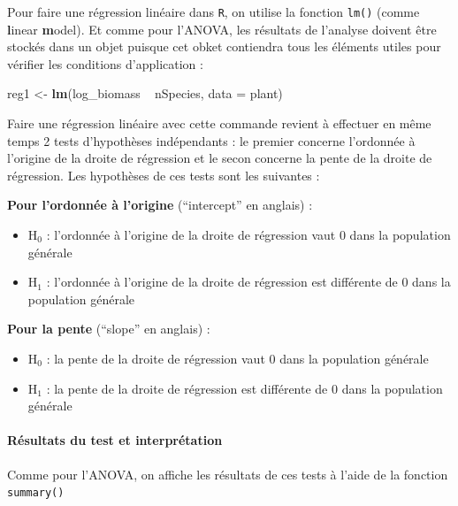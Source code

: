\documentclass[a4paperpaper,]{article}
\newenvironment{Shaded}{\begin{snugshade}}{\end{snugshade}}
\newcommand{\DataTypeTok}[1]{\textcolor[rgb]{0.00,0.34,0.68}{#1}}
\newcommand{\KeywordTok}[1]{\textcolor[rgb]{0.12,0.11,0.11}{\textbf{#1}}}
\newcommand{\NormalTok}[1]{\textcolor[rgb]{0.12,0.11,0.11}{#1}}
\newcommand{\OperatorTok}[1]{\textcolor[rgb]{0.12,0.11,0.11}{#1}}
\newcommand{\StringTok}[1]{\textcolor[rgb]{0.75,0.01,0.01}{#1}}
\providecommand{\tightlist}{%
  \setlength{\itemsep}{0pt}\setlength{\parskip}{0pt}}
\let\oldparagraph\paragraph
\renewcommand{\paragraph}[1]{\oldparagraph{#1}\mbox{}}
\begin{document}
Pour faire une régression linéaire dans \texttt{R}, on utilise la fonction \texttt{lm()} (comme \textbf{l}inear \textbf{m}odel). Et comme pour l'ANOVA, les résultats de l'analyse doivent être stockés dans un objet puisque cet obket contiendra tous les éléments utiles pour vérifier les conditions d'application :

\begin{Shaded}
\begin{Highlighting}[]
\NormalTok{reg1 <-}\StringTok{ }\KeywordTok{lm}\NormalTok{(log_biomass }\OperatorTok{~}\StringTok{ }\NormalTok{nSpecies, }\DataTypeTok{data =}\NormalTok{ plant)}
\end{Highlighting}
\end{Shaded}

Faire une régression linéaire avec cette commande revient à effectuer en même temps 2 tests d'hypothèses indépendants : le premier concerne l'ordonnée à l'origine de la droite de régression et le secon concerne la pente de la droite de régression. Les hypothèses de ces tests sont les suivantes :

\textbf{Pour l'ordonnée à l'origine} (``intercept'' en anglais) :

\begin{itemize}
\tightlist
\item
  H\(_0\) : l'ordonnée à l'origine de la droite de régression vaut 0 dans la population générale
\item
  H\(_1\) : l'ordonnée à l'origine de la droite de régression est différente de 0 dans la population générale
\end{itemize}

\textbf{Pour la pente} (``slope'' en anglais) :

\begin{itemize}
\tightlist
\item
  H\(_0\) : la pente de la droite de régression vaut 0 dans la population générale
\item
  H\(_1\) : la pente de la droite de régression est différente de 0 dans la population générale
\end{itemize}

\hypertarget{resultats-du-test-et-interpretation-1}{%
\paragraph{Résultats du test et interprétation}\label{resultats-du-test-et-interpretation-1}}

Comme pour l'ANOVA, on affiche les résultats de ces tests à l'aide de la fonction \texttt{summary()}
\end{document}
